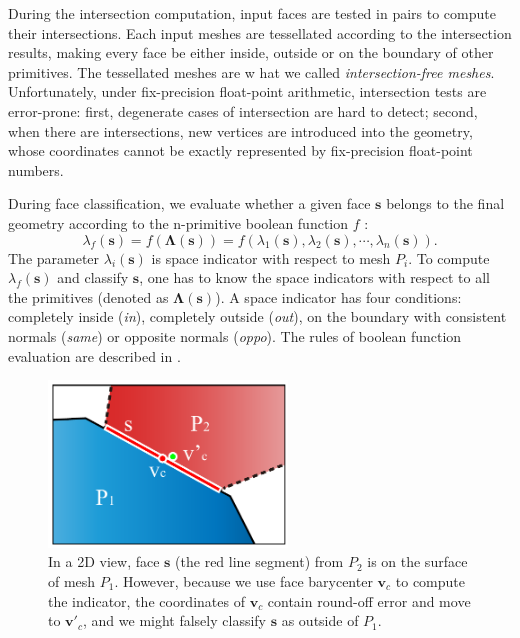 \documentclass[10pt,journal,compsoc]{IEEEtran}
\begin{document}
During the intersection computation, input faces are tested in pairs to compute their intersections. Each input meshes are tessellated according to the intersection results, making every face be either inside, outside or on the boundary of other primitives. The tessellated meshes are w hat we called \emph{intersection-free meshes}. Unfortunately, under fix-precision float-point arithmetic, intersection tests are error-prone: first, degenerate cases of intersection are hard to detect; second, when there are intersections, new vertices are introduced into the geometry, whose coordinates cannot be exactly represented by fix-precision float-point numbers.

During face classification, we evaluate whether a given face $\bm{s}$ belongs to the final geometry according to the n-primitive boolean function $f$ :
\begin{equation}
\lambda_f(\bm{s}) = f(\boldsymbol{\Lambda}(\bm{s})) = f(\lambda_1(\bm{s}), \lambda_2(\bm{s}), \cdots, \lambda_n(\bm{s})).
\end{equation}
The parameter $\lambda_i(\bm{s})$ is space indicator with respect to mesh $P_i$. To compute $\lambda_f(\bm{s})$ and classify $\bm{s}$, one has to know the space indicators with respect to all the primitives (denoted as $\boldsymbol{\Lambda}(\bm{s})$). A space indicator has four conditions: completely inside (\emph{in}), completely outside (\emph{out}), on the boundary with consistent normals (\emph{same}) or opposite normals (\emph{oppo}). The rules of boolean function evaluation are described in \cite{douze2015quickcsg,feito2013fast}.

\begin{figure}[t]
\centering
\includegraphics[width=2.5in]{falseclass}
\caption{In a 2D view, face $\bm{s}$ (the red line segment) from $P_2$ is on the surface of mesh $P_1$. However, because we use face barycenter $\bm{v}_c$ to compute the indicator, the coordinates of $\bm{v}_c$ contain round-off error and move to $\bm{v}'_c$, and we might falsely classify $\bm{s}$ as outside of $P_1$.}
\label{fig:falseclass}
\end{figure}
\end{document}
